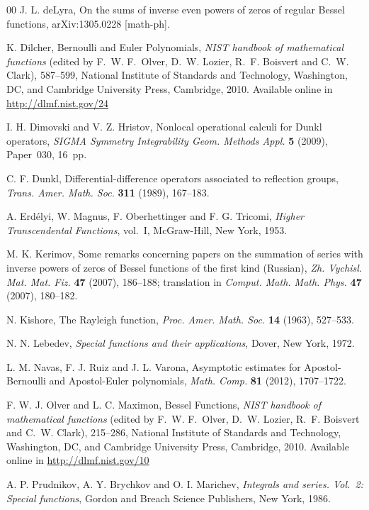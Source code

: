 \documentclass[10pt,a4paper]{article}
\theoremstyle{plain}
\theoremstyle{definition}
\numberwithin{equation}{section} %
\begin{document}
\begin{thebibliography}{00}
J. L. deLyra,
{On the sums of inverse even powers of zeros of regular Bessel functions},
arXiv:1305.0228 [math-ph].

K. Dilcher,
Bernoulli and Euler Polynomials,
\textit{NIST handbook of mathematical functions}
(edited by F.~W. F.~Olver, D.~W. Lozier, R.~F. Boisvert and C.~W. Clark),
587--599, %
National Institute of Standards and Technology, Washington, DC, and
Cambridge University Press, Cambridge, 2010.
Available online in \url{http://dlmf.nist.gov/24}

I. H. Dimovski and V. Z. Hristov,
Nonlocal operational calculi for Dunkl operators,
\textit{SIGMA Symmetry Integrability Geom. Methods Appl.}
\textbf{5} (2009), Paper~030, 16~pp.

C. F. Dunkl,
{Differential-difference operators associated to reflection groups},
\textit{Trans. Amer. Math. Soc.}
\textbf{311} (1989), 167--183.

A. Erd\'elyi, W. Magnus, F. Oberhettinger and F. G. Tricomi,
\textit{Higher Transcendental Functions},
vol.~I, McGraw-Hill, New York, 1953.

M. K. Kerimov,
Some remarks concerning papers on the summation of series with inverse powers of zeros of Bessel functions of the first kind (Russian),
\textit{Zh. Vychisl. Mat. Mat. Fiz.}
\textbf{47} (2007), 186--188;
translation in \textit{Comput. Math. Math. Phys.}
\textbf{47} (2007), 180--182.

N. Kishore,
The Rayleigh function,
\textit{Proc. Amer. Math. Soc.}
\textbf{14} (1963), 527--533.

N. N. Lebedev,
\textit{Special functions and their applications},
Dover, New York, 1972.

L. M. Navas, F. J. Ruiz and J. L. Varona,
Asymptotic estimates for Apostol-Bernoulli and Apostol-Euler polynomials,
\textit{Math. Comp.}
\textbf{81} (2012), 1707--1722.

F. W. J. Olver and L. C. Maximon,
Bessel Functions,
\textit{NIST handbook of mathematical functions}
(edited by F.~W. F.~Olver, D.~W. Lozier, R.~F. Boisvert and C.~W. Clark),
215--286, %
National Institute of Standards and Technology, Washington, DC, and
Cambridge University Press, Cambridge, 2010.
Available online in \url{http://dlmf.nist.gov/10}

A. P. Prudnikov, A. Y. Brychkov and O. I. Marichev,
\textit{Integrals and series. Vol.~2: Special functions},
Gordon and Breach Science Publishers, New York, 1986.


\end{thebibliography}
\end{document}
